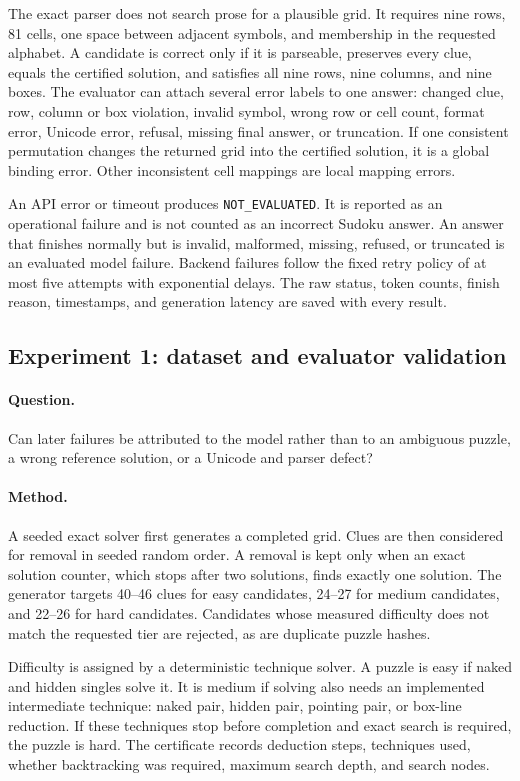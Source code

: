 \documentclass[11pt,a4paper]{article}
\begin{document}
The exact parser does not search prose for a plausible grid.  It requires nine rows, 81 cells, one space between adjacent symbols, and membership in the requested alphabet.  A candidate is correct only if it is parseable, preserves every clue, equals the certified solution, and satisfies all nine rows, nine columns, and nine boxes.  The evaluator can attach several error labels to one answer: changed clue, row, column or box violation, invalid symbol, wrong row or cell count, format error, Unicode error, refusal, missing final answer, or truncation.  If one consistent permutation changes the returned grid into the certified solution, it is a global binding error.  Other inconsistent cell mappings are local mapping errors.

An API error or timeout produces \texttt{NOT\_EVALUATED}.  It is reported as an operational failure and is not counted as an incorrect Sudoku answer.  An answer that finishes normally but is invalid, malformed, missing, refused, or truncated is an evaluated model failure.  Backend failures follow the fixed retry policy of at most five attempts with exponential delays.  The raw status, token counts, finish reason, timestamps, and generation latency are saved with every result.

\subsection{Experiment 1: dataset and evaluator validation}
\paragraph{Question.}
Can later failures be attributed to the model rather than to an ambiguous puzzle, a wrong reference solution, or a Unicode and parser defect?

\paragraph{Method.}
A seeded exact solver first generates a completed grid.  Clues are then considered for removal in seeded random order.  A removal is kept only when an exact solution counter, which stops after two solutions, finds exactly one solution.  The generator targets 40--46 clues for easy candidates, 24--27 for medium candidates, and 22--26 for hard candidates.  Candidates whose measured difficulty does not match the requested tier are rejected, as are duplicate puzzle hashes.

Difficulty is assigned by a deterministic technique solver.  A puzzle is easy if naked and hidden singles solve it.  It is medium if solving also needs an implemented intermediate technique: naked pair, hidden pair, pointing pair, or box-line reduction.  If these techniques stop before completion and exact search is required, the puzzle is hard.  The certificate records deduction steps, techniques used, whether backtracking was required, maximum search depth, and search nodes.
\end{document}
